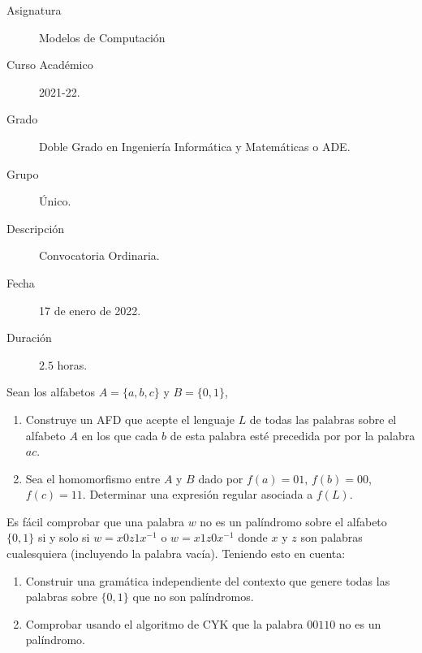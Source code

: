 \documentclass[12pt]{article}
\begin{document}

    
    

    \begin{description}
        \item[Asignatura] Modelos de Computación
        \item[Curso Académico] 2021-22.
        \item[Grado] Doble Grado en Ingeniería Informática y Matemáticas o ADE.
        \item[Grupo] Único.
        \item[Descripción] Convocatoria Ordinaria.
        \item[Fecha] 17 de enero de 2022.
        \item[Duración] $2.5$ horas.    
    \end{description}
    \newpage

\begin{ejercicio}[2.5 puntos]
    Sean los alfabetos $A = \{a, b, c\}$ y $B = \{0, 1\}$,
    \begin{enumerate}
        \item Construye un AFD que acepte el lenguaje $L$ de todas las palabras sobre el alfabeto $A$ en los que cada $b$ de esta palabra esté precedida por por la palabra $ac$.
        \item Sea el homomorfismo entre $A$ y $B$ dado por $f(a) = 01$, $f(b) = 00$, $f(c) = 11$. Determinar una expresión regular asociada a $f(L)$.
    \end{enumerate}
\end{ejercicio}

\begin{ejercicio}[2.5 puntos]
    Es fácil comprobar que una palabra $w$ no es un palíndromo sobre el alfabeto $\{0, 1\}$ si y solo si $w = x0z1x^{-1}$ o $w = x1z0x^{-1}$ donde $x$ y $z$ son palabras cualesquiera (incluyendo la palabra vacía). Teniendo esto en cuenta:
    \begin{enumerate}
        \item Construir una gramática independiente del contexto que genere todas las palabras sobre $\{0, 1\}$ que no son palíndromos.
        \item Comprobar usando el algoritmo de CYK que la palabra $00110$ no es un palíndromo.
    \end{enumerate}
\end{ejercicio}
\end{document}
